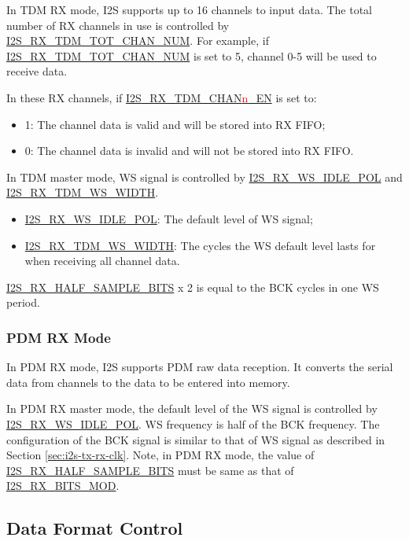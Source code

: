 \documentclass[main\_\_EN.tex]{subfiles}
\begin{document}
In TDM RX mode, I2S supports up to 16 channels to input data. The total number of RX channels in use is controlled by \hyperref[fielddesc:I2SRXTDMTOTCHANNUM]{I2S\_RX\_TDM\_TOT\_CHAN\_NUM}. For example, if \hyperref[fielddesc:I2SRXTDMTOTCHANNUM]{I2S\_RX\_TDM\_TOT\_CHAN\_NUM} is set to 5, channel 0-5 will be used to receive data.

In these RX channels, if \hyperref[fielddesc:I2STXTDMCHAN0EN]{I2S\_RX\_TDM\_CHAN{\textcolor{red}{n}}\_EN} is set to:
\begin{itemize}
    \item 1: The channel data is valid and will be stored into RX FIFO;
    \item 0: The channel data is invalid and will not be stored into RX FIFO.
\end{itemize}
In TDM master mode, WS signal is controlled by \hyperref[fielddesc:I2SRXWSIDLEPOL]{I2S\_RX\_WS\_IDLE\_POL} and \hyperref[fielddesc:I2SRXTDMWSWIDTH]{I2S\_RX\_TDM\_WS\_WIDTH}.
\begin{itemize}
    \item \hyperref[fielddesc:I2SRXWSIDLEPOL]{I2S\_RX\_WS\_IDLE\_POL}: The default level of WS signal;
    \item \hyperref[fielddesc:I2SRXTDMWSWIDTH]{I2S\_RX\_TDM\_WS\_WIDTH}: The cycles the WS default level lasts for when receiving all channel data.
\end{itemize}

\hyperref[fielddesc:I2SRXHALFSAMPLEBITS]{I2S\_RX\_HALF\_SAMPLE\_BITS} x 2 is equal to the BCK cycles in one WS period.

\subsubsection{PDM RX Mode} 

In PDM RX mode, I2S supports PDM raw data reception. It converts the serial data from channels to the data to be entered into memory.

In PDM RX master mode, the default level of the WS signal is controlled by \hyperref[fielddesc:I2SRXWSIDLEPOL]{I2S\_RX\_WS\_IDLE\_POL}. WS frequency is half of the BCK frequency. The configuration of the BCK signal is similar to that of WS signal as described in Section \ref{sec:i2s-tx-rx-clk}. Note, in PDM RX mode, the value of \hyperref[fielddesc:I2SRXHALFSAMPLEBITS]{I2S\_RX\_HALF\_SAMPLE\_BITS} must be same as that of \hyperref[fielddesc:I2SRXBITSMOD]{I2S\_RX\_BITS\_MOD}.

\subsection{Data Format Control}
\end{document}

